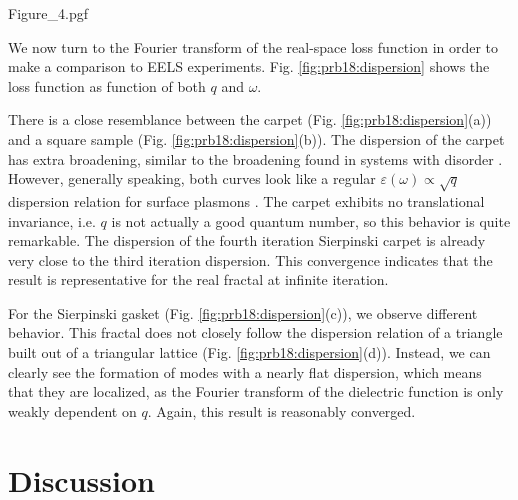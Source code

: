\begin{figure*}[t]
    \centering
    {Figure_4.pgf}
    \caption{
        Dispersion relation $\;-\operatorname{Im}[1 / \langle\mathbf{q}|
        \hat\varepsilon(\omega) |\mathbf{q}\rangle]$, showing the frequency and
        momentum dependency of the loss function. Momentum was taken along the
        $x$--axis. (a) A square built out of square lattice as compared
        to (b) the fourth iteration Sierpinski carpet. Similarly,
        (c) a triangle built out of triangular lattice as compared to
        (d) a sixth iteration Sierpinski gasket. The maximum of the left
        hand side is plotted as a dashed white line on the right hand side.
    }
    \label{fig:prb18:dispersion}
\end{figure*}

We now turn to the Fourier transform of the real-space loss function in order to make a comparison to EELS experiments. Fig. \ref{fig:prb18:dispersion} shows the loss function as function of both $q$ and $\omega$.

There is a close resemblance between the carpet (Fig. \ref{fig:prb18:dispersion}(a)) and a square sample (Fig. \ref{fig:prb18:dispersion}(b)). The dispersion of the carpet has extra broadening, similar to the broadening found in systems with disorder \cite{jin2015screening}. However, generally speaking, both curves look like a regular $\varepsilon(\omega) \propto \sqrt{q}$ dispersion relation for surface plasmons \cite{giuliani2005quantum}. The carpet exhibits no translational invariance, i.e. $q$ is not actually a good quantum number, so this behavior is quite remarkable. The dispersion of the fourth iteration Sierpinski carpet is already very close to the third iteration dispersion. This convergence indicates that the result is representative for the real fractal at infinite iteration.

For the Sierpinski gasket (Fig. \ref{fig:prb18:dispersion}(c)), we observe different behavior. This fractal does not closely follow the dispersion relation of a triangle built out of a triangular lattice (Fig.  \ref{fig:prb18:dispersion}(d)).  Instead, we can clearly see the formation of modes with a nearly flat dispersion, which means that they are localized, as the Fourier transform of the dielectric function is only weakly dependent on $q$. Again, this result is reasonably converged.

\section{Discussion}

